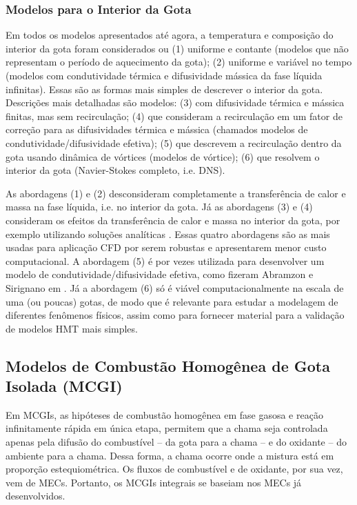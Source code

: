 \subsubsection{Modelos para o Interior da Gota} \label{sec:int}

Em todos os modelos apresentados até agora, a temperatura e composição do interior da gota foram considerados ou (1) uniforme e contante (modelos que não representam o período de aquecimento da gota); (2) uniforme e variável no tempo (modelos com condutividade térmica e difusividade mássica da fase líquida infinitas).
Essas são as formas mais simples de descrever o interior da gota.
Descrições mais detalhadas são modelos: (3) com difusividade térmica e mássica finitas, mas sem recirculação; (4) que consideram a recirculação em um fator de correção para as difusividades térmica e mássica (chamados modelos de condutividade/difusividade efetiva); (5) que descrevem a recirculação dentro da gota usando dinâmica de vórtices (modelos de vórtice); (6) que resolvem o interior da gota (Navier-Stokes completo, i.e. DNS). \cite{Sazhin2006}

As abordagens (1) e (2) desconsideram completamente a transferência de calor e massa na fase líquida, i.e. no interior da gota.
Já as abordagens (3) e (4) consideram os efeitos da transferência de calor e massa no interior da gota, por exemplo utilizando soluções analíticas \cite{ZanuttoC2019}.
Essas quatro abordagens são as mais usadas para aplicação CFD por serem robustas e apresentarem menor custo computacional. 
A abordagem (5) é por vezes utilizada para desenvolver um modelo de condutividade/difusividade efetiva, como fizeram Abramzon e Sirignano em \cite{Sirignano1989}.
Já a abordagem (6) só é viável computacionalmente na escala de uma (ou poucas) gotas, de modo que é relevante para estudar a modelagem de diferentes fenômenos físicos, assim como para fornecer material para a validação de modelos HMT mais simples.



\subsection{Modelos de Combustão Homogênea de Gota Isolada (MCGI)} \label{sec:MCGI}

Em MCGIs, as hipóteses de combustão homogênea em fase gasosa e reação infinitamente rápida em única etapa, permitem que a chama seja controlada apenas pela difusão do combustível -- da gota para a chama -- e do oxidante -- do ambiente para a chama.
Dessa forma, a chama ocorre onde a mistura está em proporção estequiométrica.
Os fluxos de combustível e de oxidante, por sua vez, vem de MECs.
Portanto, os MCGIs integrais se baseiam nos MECs já desenvolvidos.


